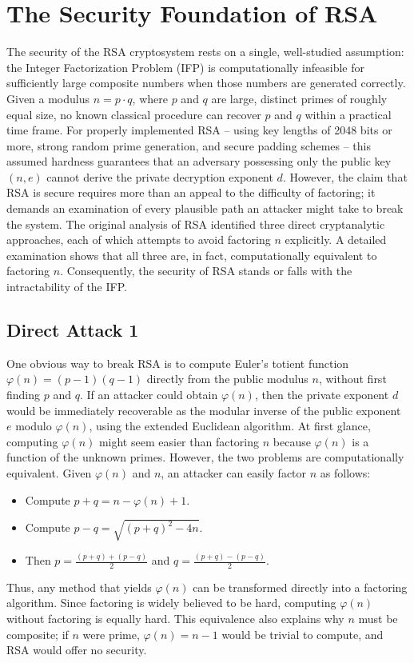 \chapter{ The Security Foundation of RSA}

The security of the RSA cryptosystem rests on a single, well-studied assumption: the Integer Factorization Problem (IFP) is computationally infeasible for sufficiently large composite numbers when those numbers are generated correctly. Given a modulus \(n = p \cdot q\), where \(p\) and \(q\) are large, distinct primes of roughly equal size, no known classical procedure can recover \(p\) and \(q\) within a practical time frame. For properly implemented RSA – using key lengths of 2048 bits or more, strong random prime generation, and secure padding schemes – this assumed hardness guarantees that an adversary possessing only the public key \((n, e)\) cannot derive the private decryption exponent \(d\). However, the claim that RSA is secure requires more than an appeal to the difficulty of factoring; it demands an examination of every plausible path an attacker might take to break the system. The original analysis of RSA identified three direct cryptanalytic approaches, each of which attempts to avoid factoring \(n\) explicitly. A detailed examination shows that all three are, in fact, computationally equivalent to factoring \(n\). Consequently, the security of RSA stands or falls with the intractability of the IFP.

\section{Direct Attack 1}

One obvious way to break RSA is to compute Euler’s totient function \(\varphi(n) = (p-1)(q-1)\) directly from the public modulus \(n\), without first finding \(p\) and \(q\). If an attacker could obtain \(\varphi(n)\), then the private exponent \(d\) would be immediately recoverable as the modular inverse of the public exponent \(e\) modulo \(\varphi(n)\), using the extended Euclidean algorithm. At first glance, computing \(\varphi(n)\) might seem easier than factoring \(n\) because \(\varphi(n)\) is a function of the unknown primes. However, the two problems are computationally equivalent. Given \(\varphi(n)\) and \(n\), an attacker can easily factor \(n\) as follows:
\begin{itemize}
\item Compute \(p+q = n - \varphi(n) + 1\).
\item Compute \(p-q = \sqrt{(p+q)^2 - 4n}\).
\item Then \(p = \frac{(p+q)+(p-q)}{2}\) and \(q = \frac{(p+q)-(p-q)}{2}\).
\end{itemize}
Thus, any method that yields \(\varphi(n)\) can be transformed directly into a factoring algorithm. Since factoring is widely believed to be hard, computing \(\varphi(n)\) without factoring is equally hard. This equivalence also explains why \(n\) must be composite; if \(n\) were prime, \(\varphi(n)=n-1\) would be trivial to compute, and RSA would offer no security.

